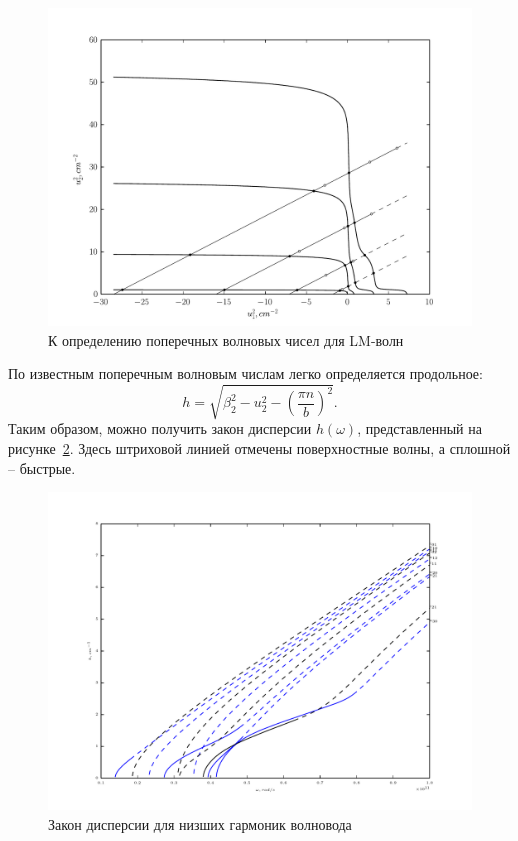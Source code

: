 \begin{figure}[h]
    \center
    \includegraphics[width=.7\textwidth]{dispersion/lm.png}
    \caption{К определению поперечных волновых чисел для LM-волн}
    \label{fig:lm_dispersion}
\end{figure}

По известным поперечным волновым числам легко определяется продольное:
\[
    h = \sqrt{\beta_2^2 - u_2^2 - \left(\frac{\pi n}{b}\right)^2}.
\]
Таким образом, можно получить закон дисперсии \( h(\omega) \), представленный на
рисунке~\ref{fig:dispersion}. Здесь штриховой линией отмечены поверхностные
волны, а сплошной -- быстрые.

\begin{figure}[H]
    \center
    \includegraphics[width=.7\textwidth]{dispersion.pdf}
    \caption{Закон дисперсии для низших гармоник волновода}
    \label{fig:dispersion}
\end{figure}

